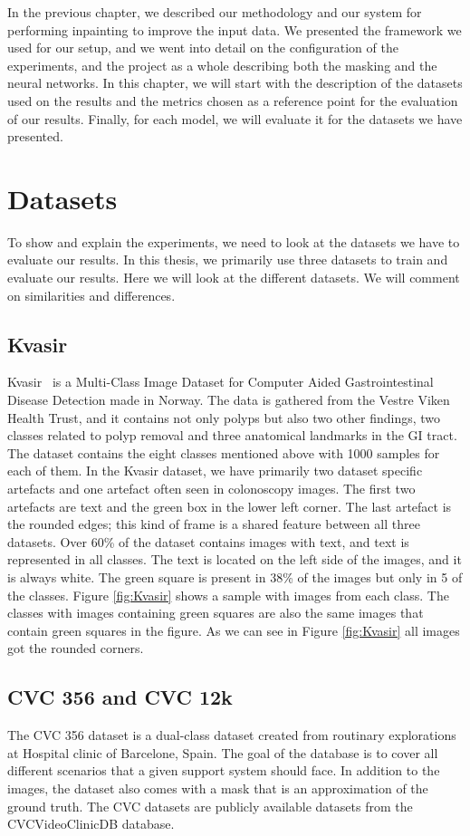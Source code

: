 In the previous chapter, we described our methodology and our system for performing inpainting to improve the input data. We presented the framework we used for our setup, and we went into detail on the configuration of the experiments, and the project as a whole describing both the masking and the neural networks. 
In this chapter, we will start with the description of the datasets used on the results and the metrics chosen as a reference point for the evaluation of our results. 
Finally, for each model, we will evaluate it for the datasets we have presented.

\section{Datasets}
To show and explain the experiments, we need to look at the datasets we have to evaluate our results. 
In this thesis, we primarily use three datasets to train and evaluate our results. Here we will look at the different datasets. We will comment on similarities and differences. 


\subsection{Kvasir}
Kvasir~\cite{Pogorelov:2017:KMI:3083187.3083212} is a Multi-Class Image Dataset for Computer Aided Gastrointestinal Disease Detection made in Norway. The data is gathered from the Vestre Viken Health Trust, and it contains not only polyps but also two other findings, two classes related to polyp removal and three anatomical landmarks in the GI tract.
The dataset contains the eight classes mentioned above with 1000 samples for each of them.  In the Kvasir dataset, we have primarily two dataset specific artefacts and one artefact often seen in colonoscopy images. The first two artefacts are text and the green box in the lower left corner. The last artefact is the rounded edges; this kind of frame is a shared feature between all three datasets.
Over 60\% of the dataset contains images with text, and text is represented in all classes. The text is located on the left side of the images, and it is always white.
The green square is present in 38\% of the images but only in 5 of the classes. Figure \ref{fig:Kvasir} shows a sample with images from each class. The classes with images containing green squares are also the same images that contain green squares in the figure.
As we can see in Figure \ref{fig:Kvasir} all images got the rounded corners.


\subsection{CVC 356 and CVC 12k}
The CVC 356 dataset is a dual-class dataset created from routinary explorations at Hospital clinic of Barcelone, Spain. 
The goal of the database is to cover all different scenarios that a given support system should face. In addition to the images, the dataset also comes with a mask that is an approximation of the ground truth.
The CVC datasets are publicly available datasets from the CVCVideoClinicDB database.

